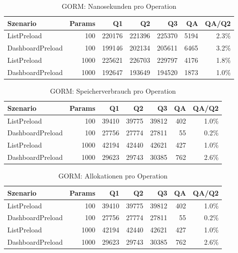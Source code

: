 
\begin{table}[ht]
\caption{GORM: Nanosekunden pro Operation}
\begin{tabular}{lrrrrrr}
\toprule
Szenario & Params & Q1 & Q2 & Q3 & QA & QA/Q2 \\
\midrule
	ListPreload & 100 & 220176 & 221396 & 225370 & 5194 & 2.3\% \\
	DashboardPreload & 100 & 199146 & 202134 & 205611 & 6465 & 3.2\% \\
	ListPreload & 1000 & 225621 & 226703 & 229797 & 4176 & 1.8\% \\
	DashboardPreload & 1000 & 192647 & 193649 & 194520 & 1873 & 1.0\% \\
\bottomrule
\end{tabular}
\label{tab:benchmark_gorm_nsperop}
\end{table}
	
\begin{table}[ht]
\caption{GORM: Speicherverbrauch pro Operation}
\begin{tabular}{lrrrrrr}
\toprule
Szenario & Params & Q1 & Q2 & Q3 & QA & QA/Q2 \\
\midrule
	ListPreload & 100 & 39410 & 39775 & 39812 & 402 & 1.0\% \\
	DashboardPreload & 100 & 27756 & 27774 & 27811 & 55 & 0.2\% \\
	ListPreload & 1000 & 42194 & 42440 & 42621 & 427 & 1.0\% \\
	DashboardPreload & 1000 & 29623 & 29743 & 30385 & 762 & 2.6\% \\
\bottomrule
\end{tabular}
\label{tab:benchmark_gorm_bytesperop}
\end{table}
	
\begin{table}[ht]
\caption{GORM: Allokationen pro Operation}
\begin{tabular}{lrrrrrr}
\toprule
Szenario & Params & Q1 & Q2 & Q3 & QA & QA/Q2 \\
\midrule
	ListPreload & 100 & 39410 & 39775 & 39812 & 402 & 1.0\% \\
	DashboardPreload & 100 & 27756 & 27774 & 27811 & 55 & 0.2\% \\
	ListPreload & 1000 & 42194 & 42440 & 42621 & 427 & 1.0\% \\
	DashboardPreload & 1000 & 29623 & 29743 & 30385 & 762 & 2.6\% \\
\bottomrule
\end{tabular}
\label{tab:benchmark_gorm_allocsperop}
\end{table}
	